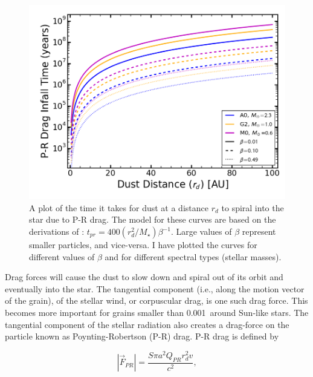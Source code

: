     \begin{figure}
    \centering
    \includegraphics[width=\textwidth]{Ch1/PR_Drag_time} 
    \caption[Poynting-Robertson Drag Timescales]{A plot of the time it takes for dust at a distance $r_d$ to spiral into the star due to P-R drag. The model for these curves are based on the derivations of \citet{Burns1979}: $t_{pr}=400(r_d^2/M_\star)\beta^{-1}$. Large values of $\beta$ represent smaller particles, and vice-versa. I have plotted the curves for different values of $\beta$ and for different spectral types (stellar masses).}
    \label{fig:PR_Drag_time}
    \end{figure}
    
    Drag forces will cause the dust to slow down and spiral out of its orbit and eventually into the star. The tangential component (i.e., along the motion vector of the grain), of the stellar wind, or corpuscular drag, is one such drag force. This becomes more important for grains smaller than 0.001\micron\ around Sun-like stars\citep{Burns1979}. The tangential component of the stellar radiation also creates a drag-force on the particle known as Poynting-Robertson (P-R) drag. P-R drag is defined by
    
    \begin{equation}\label{eq:pr_drag}
    |\vec{F}_{PR}| = \frac{S\pi a^2 Q_{PR}r_d^2 v}{c^2},
    \end{equation}
    
